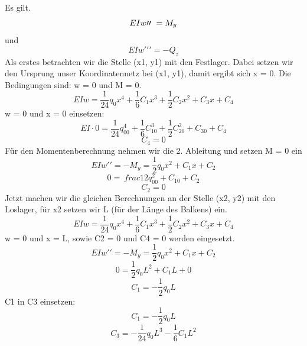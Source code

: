 Es gilt.
\begin{equation}
	EIw\prime\prime\ =
	\-M_y
\end{equation}
und
\begin{equation}
	EIw\prime\prime\prime=
	-Q_z
\end{equation}
Als erstes betrachten wir die Stelle (x1, y1) mit den Festlager.
Dabei setzen wir den Ursprung unser Koordinatennetz bei (x1, y1), damit ergibt sich x = 0.
Die Bedingungen sind: w = 0 und M = 0.
\begin{equation}
	EIw=
	\frac{1}{24}q_0x^4+\frac{1}{6}C_1x^3+\frac{1}{2}C_2x^2+C_3x+C_4
\end{equation}
w = 0 und x = 0 einsetzen:
\begin{equation}
	EI\cdot0=
	\frac{1}{24}q_00^4+\frac{1}{6}C_10^3+\frac{1}{2}C_20^2+C_30+C_4
\end{equation}
\begin{equation}
	C_4=
	0
\end{equation}
Für den Momentenberechnung nehmen wir die 2. Ableitung und setzen M = 0 ein
\begin{equation}
	EIw\prime\prime=
	-M_y=
	\frac{1}{2}q_0x^2+C_1x+C_2
\end{equation}
\begin{equation}
	0=\
	frac{1}{2}q_00^2+C_10+C_2
\end{equation}
\begin{equation}
	C_2=
	0
\end{equation}
Jetzt machen wir die gleichen Berechnungen an der Stelle (x2, y2) mit den Loslager, für x2 setzen wir L (für der Länge des Balkens) ein.
\begin{equation}
	EIw=
	\frac{1}{24}q_0x^4+\frac{1}{6}C_1x^3+\frac{1}{2}C_2x^2+C_3x+C_4
\end{equation}
w = 0 und x = L, sowie C2 = 0 und C4 = 0 werden eingesetzt.
\begin{equation}
	EIw\prime\prime=
	-M_y=\frac{1}{2}q_0x^2+C_1x+C_2
\end{equation}
\begin{equation}
	0=
	\frac{1}{2}q_0L^2+C_1L+0
\end{equation}
\begin{equation}
	C_1=
	-\frac{1}{2}q_0L
\end{equation}
C1 in C3 einsetzen:
\begin{equation}
	C_1=
	-\frac{1}{2}q_0L
\end{equation}
\begin{equation}
	C_3=
	-\frac{1}{24}q_0L^3-\frac{1}{6}C_1L^2
\end{equation}
